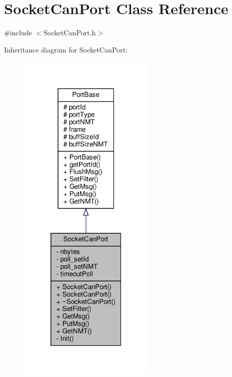 \hypertarget{classSocketCanPort}{}\section{Socket\+Can\+Port Class Reference}
\label{classSocketCanPort}


{\ttfamily \#include $<$Socket\+Can\+Port.\+h$>$}



Inheritance diagram for Socket\+Can\+Port\+:
\nopagebreak
\begin{figure}[H]
\begin{center}
\leavevmode
\includegraphics[width=184pt]{classSocketCanPort__inherit__graph}
\end{center}
\end{figure}



